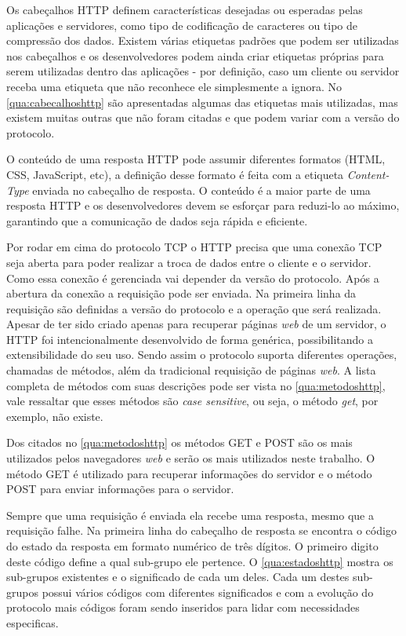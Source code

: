 Os cabeçalhos HTTP definem características desejadas ou esperadas pelas aplicações e servidores, como tipo de codificação de caracteres ou tipo de compressão dos dados. Existem várias etiquetas padrões que podem ser utilizadas nos cabeçalhos e os desenvolvedores podem ainda criar etiquetas próprias para serem utilizadas dentro das aplicações - por definição, caso um cliente ou servidor receba uma etiqueta que não reconhece ele simplesmente a ignora. No \autoref{qua:cabecalhoshttp} são apresentadas algumas das etiquetas mais utilizadas, mas existem muitas outras que não foram citadas e que podem variar com a versão do protocolo.



O conteúdo de uma resposta HTTP pode assumir diferentes formatos (HTML, CSS, JavaScript, etc), a definição desse formato é feita com a etiqueta \textit{Content-Type} enviada no cabeçalho de resposta. O conteúdo é a maior parte de uma resposta HTTP e os desenvolvedores devem se esforçar para reduzi-lo ao máximo, garantindo que a comunicação de dados seja rápida e eficiente.

Por rodar em cima do protocolo TCP o HTTP precisa que uma conexão TCP seja aberta para poder realizar a troca de dados entre o cliente e o servidor. Como essa conexão é gerenciada vai depender da versão do protocolo. Após a abertura da conexão a requisição pode ser enviada. Na primeira linha da requisição são definidas a versão do protocolo e a operação que será realizada. Apesar de ter sido criado apenas para recuperar páginas \textit{web} de um servidor, o HTTP foi intencionalmente desenvolvido de forma genérica, possibilitando a extensibilidade do seu uso. Sendo assim o protocolo suporta diferentes operações, chamadas de métodos, além da tradicional requisição de páginas \textit{web}. A lista completa de métodos com suas descrições pode ser vista no \autoref{qua:metodoshttp}, vale ressaltar que esses métodos são \textit{case sensitive}, ou seja, o método \textit{get}, por exemplo, não existe.



Dos citados no \autoref{qua:metodoshttp} os métodos GET e POST são os mais utilizados pelos navegadores \textit{web} e serão os mais utilizados neste trabalho. O método GET é utilizado para recuperar informações do servidor e o método POST para enviar informações para o servidor.

Sempre que uma requisição é enviada ela recebe uma resposta, mesmo que a requisição falhe. Na primeira linha do cabeçalho de resposta se encontra o código do estado da resposta em formato numérico de três dígitos. O primeiro digito deste código define a qual sub-grupo ele pertence. O \autoref{qua:estadoshttp} mostra os sub-grupos existentes e o significado de cada um deles. Cada um destes sub-grupos possui vários códigos  com diferentes significados e com a evolução do protocolo mais códigos foram sendo inseridos para lidar com necessidades especificas.

